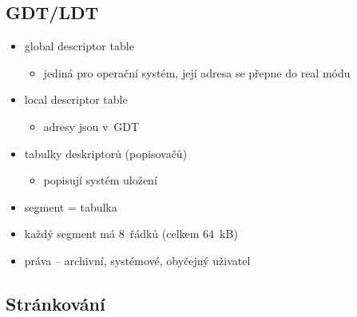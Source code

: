 \documentclass[a4paper,12pt]{article}
\providecommand{\tightlist}{%
\setlength{\itemsep}{0pt}\setlength{\parskip}{0pt}}
\begin{document}
\subsection{GDT/LDT}

\begin{itemize}
\tightlist
\item global descriptor table

  \begin{itemize}
  \tightlist
  \item jediná pro operační systém, její adresa se přepne do real módu
  \end{itemize}
\item local descriptor table

  \begin{itemize}
  \tightlist
  \item adresy jsou v~GDT
  \end{itemize}
\item tabulky deskriptorů (popisovačů)

  \begin{itemize}
  \tightlist
  \item popisují systém uložení
  \end{itemize}
\item segment = tabulka
\item každý segment má 8~řádků (celkem 64~kB)
\item práva -- archivní, systémové, obyčejný uživatel
\end{itemize}

\subsection{Stránkování}
\end{document}
